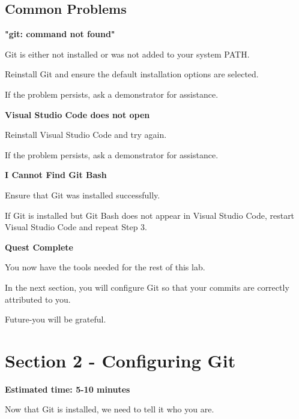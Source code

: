 \documentclass{csc2059practical}
\begin{document}
\subsection{Common Problems}
\begin{commonerror}
\textbf{"git: command not found"}\par
\medskip

Git is either not installed or was not added to your system PATH.


Reinstall Git and ensure the default installation options are selected.


If the problem persists, ask a demonstrator for assistance.


\end{commonerror}
\begin{commonerror}
\textbf{Visual Studio Code does not open}\par
\medskip

Reinstall Visual Studio Code and try again.


If the problem persists, ask a demonstrator for assistance.


\end{commonerror}
\begin{commonerror}
\textbf{I Cannot Find Git Bash}\par
\medskip

Ensure that Git was installed successfully.


If Git is installed but Git Bash does not appear in Visual Studio Code, restart Visual Studio Code and repeat Step 3.


\end{commonerror}
\begin{wrapupbox}
\textbf{Quest Complete}\par
\medskip

You now have the tools needed for the rest of this lab.


In the next section, you will configure Git so that your commits are correctly attributed to you.


Future-you will be grateful.


\end{wrapupbox}

\clearpage
\section{Section 2 - Configuring Git}
\begin{infobox}
\textbf{Estimated time: 5-10 minutes}
\end{infobox}
Now that Git is installed, we need to tell it who you are.
\end{document}
